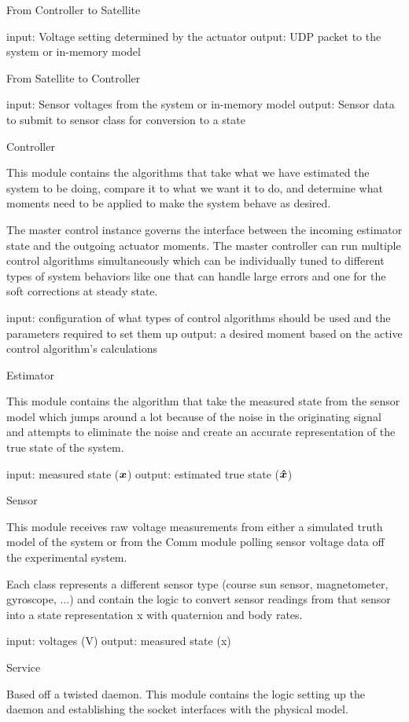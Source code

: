 From Controller to Satellite

    input: Voltage setting determined by the actuator
    output: UDP packet to the system or in-memory model

From Satellite to Controller

    input: Sensor voltages from the system or in-memory model
    output: Sensor data to submit to sensor class for conversion to a state

Controller

This module contains the algorithms that take what we have estimated the system to be doing, compare it to what we want it to do, and determine what moments need to be applied to make the system behave as desired.

The master control instance governs the interface between the incoming estimator state and the outgoing actuator moments. The master controller can run multiple control algorithms simultaneously which can be individually tuned to different types of system behaviors like one that can handle large errors and one for the soft corrections at steady state.

    input: configuration of what types of control algorithms should be used and the parameters required to set them up
    output: a desired moment based on the active control algorithm's calculations

Estimator

This module contains the algorithm that take the measured state from the sensor model which jumps around a lot because of the noise in the originating signal and attempts to eliminate the noise and create an accurate representation of the true state of the system.

    input: measured state ($\boldsymbol{x}$)
    output: estimated true state ($\boldsymbol{\hat{x}}$)

Sensor

This module receives raw voltage measurements from either a simulated truth model of the system or from the Comm module polling sensor voltage data off the experimental system.

Each class represents a different sensor type (course sun sensor, magnetometer, gyroscope, ...) and contain the logic to convert sensor readings from that sensor into a state representation x with quaternion and body rates.

    input: voltages (V)
    output: measured state (x)

Service

Based off a twisted daemon. This module contains the logic setting up the daemon and establishing the socket interfaces with the physical model.

